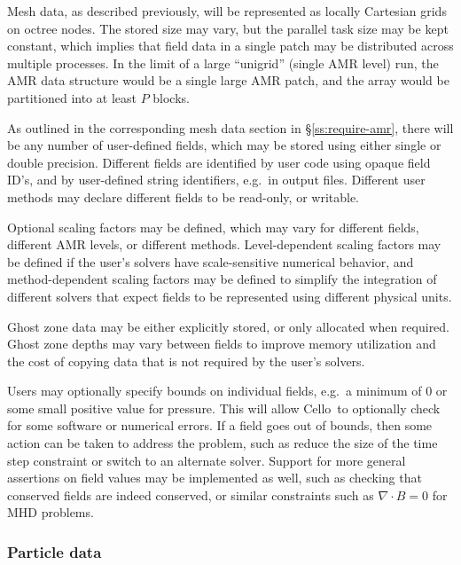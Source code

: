\documentclass[11pt,letterpaper]{article}
\newcommand{\cello}{\textsf{Cello}}
\begin{document}
Mesh data, as described previously, will be represented as locally
Cartesian grids on octree nodes.  The stored size may vary, but the
parallel task size may be kept constant, which implies that field data
in a single patch may be distributed across multiple processes.  In
the limit of a large ``unigrid'' (single AMR level) run, the AMR data
structure would be a single large AMR patch, and the array would be
partitioned into at least $P$ blocks.

As outlined in the corresponding mesh data section in
\S\ref{ss:require-amr}, there will be any number of user-defined
fields, which may be stored using either single or double precision.
Different fields are identified by user code using opaque field ID's,
and by user-defined string identifiers, e.g.~in output files.
Different user methods may declare different fields to be read-only,
or writable.

Optional scaling factors may be defined, which may vary for different
fields, different AMR levels, or different methods.  Level-dependent
scaling factors may be defined if the user's solvers have
scale-sensitive numerical behavior, and method-dependent scaling
factors may be defined to simplify the integration of different
solvers that expect fields to be represented using different physical
units.

Ghost zone data may be either explicitly stored, or only allocated
when required.  Ghost zone depths may vary between fields to improve
memory utilization and the cost of copying data that is not required
by the user's solvers.  

Users may optionally specify bounds on individual fields, e.g.~a
minimum of $0$ or some small positive value for pressure.  This will
allow \cello\ to optionally check for some software or numerical
errors.  If a field goes out of bounds, then some action can be taken
to address the problem, such as reduce the size of the time step
constraint or switch to an alternate solver.  Support for more general
assertions on field values may be implemented as well, such as
checking that conserved fields are indeed conserved, or similar
constraints such as $\nabla\cdot B=0$ for MHD problems.

\subsubsection{Particle data} \label{sss:design-particles}
\end{document}
